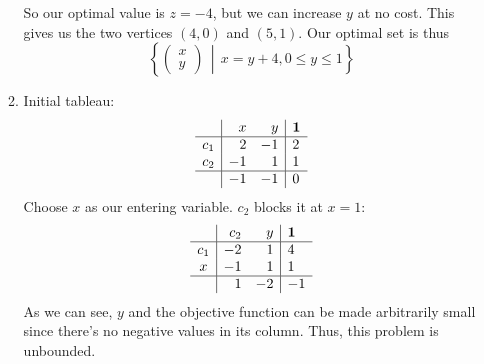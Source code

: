 \documentclass[12pt]{article}
\begin{document}
\begin{enumerate}
\begin{enumerate}
                        So our optimal value is $z=-4$, but we can increase $y$ at no cost.
                        This gives us the two vertices $(4, 0)$ and $(5, 1)$.
                        Our optimal set is thus
                        \[\left\{\begin{pmatrix}x \\ y\end{pmatrix}\,
                              \middle|\, x=y+4, 0 \le y \le 1\right\}\]
                  \item Initial tableau:
                        \[\begin{array}{c|rr|l}
                                        & x  & y  & \mathbf{1} \\ \hline
                                    c_1 & 2  & -1 & 2          \\
                                    c_2 & -1 & 1  & 1          \\ \hline
                                        & -1 & -1 & 0          \\
                              \end{array}\]
                        Choose $x$ as our entering variable.
                        $c_2$ blocks it at $x=1$:
                        \[\begin{array}{c|rr|l}
                                        & c_2 & y  & \mathbf{1} \\ \hline
                                    c_1 & -2  & 1  & 4          \\
                                    x   & -1  & 1  & 1          \\ \hline
                                        & 1   & -2 & -1         \\
                              \end{array}\]
                        As we can see, $y$ and the objective function can be made
                        arbitrarily small since there's no negative values in its column.
                        Thus, this problem is unbounded.


\end{enumerate}
\end{enumerate}
\end{document}
